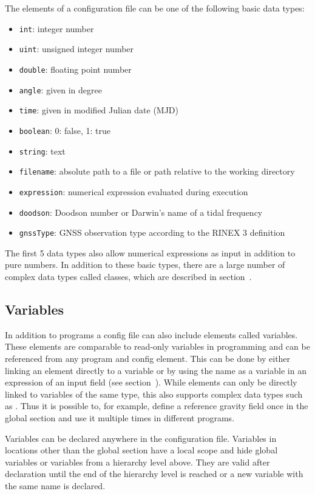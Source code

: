 The elements of a configuration file can be one of the following basic data types:
\begin{itemize}
\item \verb|int|: integer number
\item \verb|uint|: unsigned integer number
\item \verb|double|: floating point number
\item \verb|angle|: given in degree
\item \verb|time|: given in modified Julian date (MJD)
\item \verb|boolean|: 0: false, 1: true
\item \verb|string|: text
\item \verb|filename|: absolute path to a file or path relative to the working directory
\item \verb|expression|: numerical expression evaluated during execution
\item \verb|doodson|: Doodson number or Darwin's name of a tidal frequency
\item \verb|gnssType|: GNSS observation type according to the RINEX 3 definition
\end{itemize}
The first 5 data types also allow numerical expressions as input in addition to pure numbers.
In addition to these basic types, there are a large number of complex data types called classes,
which are described in section~.

\subsection{Variables}\label{general.configFiles:variables}
In addition to programs a config file can also include elements called variables.
These elements are comparable to read-only variables in programming and can be referenced from any program and config element.
This can be done by either linking an element directly to a variable or
by using the name as a variable in an expression of an input field (see section~).
While elements can only be directly linked to variables of the same type, this also supports complex data types
such as . Thus it is possible to, for example, define a reference gravity field once
in the global section and use it multiple times in different programs.

Variables can be declared anywhere in the configuration file. Variables in locations other than the global section
have a local scope and hide global variables or variables from a hierarchy level above. They are valid after
declaration until the end of the hierarchy level is reached or a new variable with the same name is declared.

